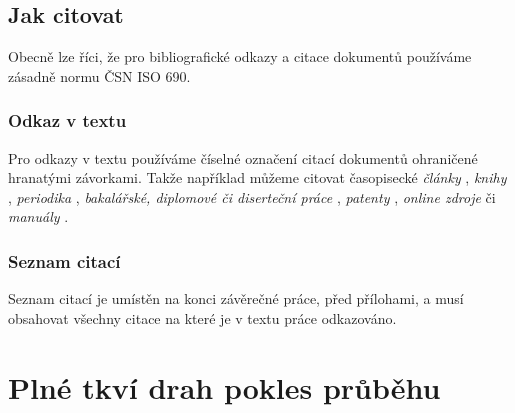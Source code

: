 \documentclass[czech,bachelor,dept460,male,cpp,cpdeclaration]{diploma}
\begin{document}
\subsection{Jak citovat}
Obecně lze říci, že pro bibliografické odkazy a citace dokumentů používáme zásadně normu ČSN ISO 690.
\subsubsection{Odkaz v textu}
Pro odkazy v textu používáme číselné označení citací dokumentů ohraničené hranatými závorkami. Takže například můžeme citovat časopisecké \emph{články} \cite{herrmann, bertram, moore, yoon, sigfridsson, baez/article}, \emph{knihy} \cite{wilde, nietzsche:ksa1, averroes/bland, hammond, cotton, knuth:ct:a, gerhardt, gonzalez, companion}, \emph{periodika} \cite{jcg}, \emph{bakalářské, diplomové či diserteční práce} \cite{geer}, \emph{patenty} \cite{kowalik, almendro, sorace, laufenberg}, \emph{online zdroje} \cite{ctan, wassenberg, itzhaki, markey, baez/online} či \emph{manuály} \cite{cms}.

\subsubsection{Seznam citací}
Seznam citací je umístěn na konci závěrečné práce, před přílohami, a musí obsahovat všechny citace na které je v textu práce odkazováno.

\printbibliography[title={Literatura}, heading=bibintoc]
%

\appendix
\section{Plné tkví drah pokles průběhu}
\end{document}
